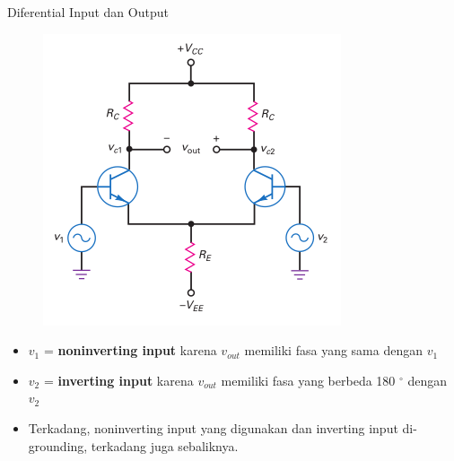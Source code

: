 \documentclass[aspectratio=169]{beamer}
\begin{document}
\begin{frame}{Diferential Input dan Output}
	\begin{multicols}{2}
		\begin{figure}
			\centering
			\includegraphics[height=0.7\textheight]{gambar/01.diff-amp/01.differential_input_output}
		\end{figure}
		\columnbreak
		\begin{itemize}
			\item $ v_1 $ = \textbf{noninverting input} karena $ v_{out} $ memiliki fasa yang sama dengan $ v_1 $
			\item $ v_2 $ = \textbf{inverting input} karena $ v_{out} $ memiliki fasa yang berbeda 180 $ ^{\circ} $ dengan $ v_2 $
			\item Terkadang, noninverting input yang digunakan dan  inverting input di-grounding, terkadang juga sebaliknya.
		\end{itemize}
	\end{multicols}
\end{frame}
\end{document}
